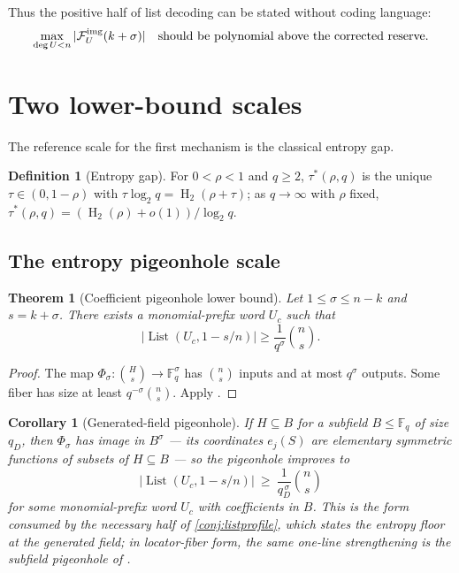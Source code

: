 \documentclass[11pt]{article}
\newtheorem{theorem}{Theorem}[section]
\newtheorem{corollary}[corollary]{Corollary}
\theoremstyle{definition}
\newtheorem{definition}[definition]{Definition}
\newcommand{\F}{\mathbb F}
\newcommand{\HH}{\operatorname{H}_2}
\newcommand{\taustar}{\tau^{*}}
\newcommand{\ImgFib}{\mathcal F^{\rm img}}
\newcommand{\List}{\operatorname{List}}
\begin{document}
Thus the positive half of list decoding can be stated without coding language:
\[
        \max_{\deg U<n}|\ImgFib_U(k+\sigma)|\quad\text{should be polynomial above the corrected reserve.}
\]

\section{Two lower-bound scales}\label{sec:lower}

The reference scale for the first mechanism is the classical entropy gap.

\begin{definition}[Entropy gap]\label{def:taustar}
For $0<\rho<1$ and $q\ge2$, $\taustar(\rho,q)$ is the unique $\tau\in(0,1-\rho)$ with $\tau\log_2q=\HH(\rho+\tau)$; as $q\to\infty$ with $\rho$ fixed, $\taustar(\rho,q)=(\HH(\rho)+o(1))/\log_2q$.
\end{definition}

\subsection{The entropy pigeonhole scale}\label{subsec:pigeon}

\begin{theorem}[Coefficient pigeonhole lower bound]\label{thm:pigeonhole}
Let $1\le\sigma\le n-k$ and $s=k+\sigma$.  There exists a monomial-prefix word $U_c$ such that
\[
        |\List(U_c,1-s/n)|\ge \frac{1}{q^\sigma}\binom ns.
\]
\end{theorem}

\begin{proof}
The map $\Phi_\sigma:\binom Hs\to\F_q^\sigma$ has $\binom ns$ inputs and at most $q^\sigma$ outputs.  Some fiber has size at least $q^{-\sigma}\binom ns$.  Apply .
\end{proof}

\begin{corollary}[Generated-field pigeonhole]\label{cor:genfield-pigeonhole}
If $H\subseteq B$ for a subfield $B\le\F_q$ of size $q_D$, then $\Phi_\sigma$ has image in $B^\sigma$ --- its coordinates $e_j(S)$ are elementary symmetric functions of subsets of $H\subseteq B$ --- so the pigeonhole improves to
\[
        |\List(U_c,1-s/n)|\ \ge\ \frac{1}{q_D^{\,\sigma}}\binom ns
\]
for some monomial-prefix word $U_c$ with coefficients in $B$.  This is the form consumed by the necessary half of \cref{conj:listprofile}, which states the entropy floor at the generated field; in locator-fiber form, the same one-line strengthening is the subfield pigeonhole of \cite[Lem.\ ``locator fibers are lists'']{UniversalCap}.
\end{corollary}
\end{document}
